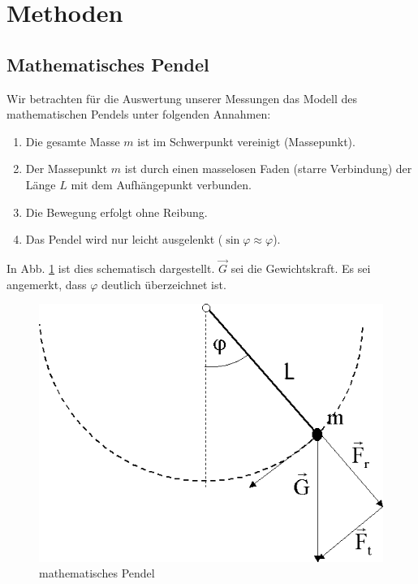 \documentclass[11pt,a4paper,titlepage, ngerman]{article}
\begin{document}
	\section{Methoden}
		
		\subsection{Mathematisches Pendel}
		\label{pendel}
		
		Wir betrachten für die Auswertung unserer Messungen das Modell des mathematischen Pendels unter folgenden Annahmen:
		\begin{enumerate}
			\item Die gesamte Masse $m$ ist im Schwerpunkt vereinigt (Massepunkt).
			\item Der Massepunkt $m$ ist durch einen masselosen Faden (starre Verbindung) der Länge $L$ mit dem Aufhängepunkt verbunden.
			\item Die Bewegung erfolgt ohne Reibung.
			\item Das Pendel wird nur leicht ausgelenkt ($\sin \varphi \approx \varphi$).
		\end{enumerate}
		In Abb. \ref{fig:matpendel} ist dies schematisch dargestellt. $\vec{G}$ sei die Gewichtskraft.
		Es sei angemerkt, dass $\varphi$ deutlich überzeichnet ist.
		
		\begin{figure}[ht]
			\centering
			\includegraphics[scale=0.4]{mathematischesPendel.png}		
			\caption{mathematisches Pendel}
			\label{fig:matpendel}
		\end{figure}
		
\end{document}
